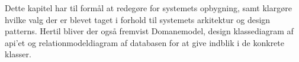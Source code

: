 Dette kapitel har til formål at redegøre for systemets opbygning, samt klargøre hvilke valg 
der er blevet taget i forhold til systemets arkitektur og design patterns. Hertil bliver der også fremvist Domanemodel, 
design klassediagram af api'et og relationmodeldiagram af databasen for at give indblik i de konkrete klasser.